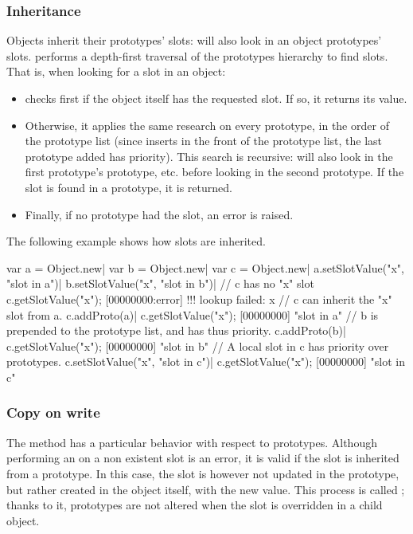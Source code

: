 \subsubsection{Inheritance}

Objects inherit their prototypes' slots:  will also
look in an object prototypes' slots.  performs a
depth-first traversal of the prototypes hierarchy to find slots. That is,
when looking for a slot in an object:

\begin{itemize}
\item {} checks first if the object itself has the
  requested slot. If so, it returns its value.
\item Otherwise, it applies the same research on every prototype, in the
  order of the prototype list (since  inserts in
  the front of the prototype list, the last prototype added has
  priority). This search is recursive:  will also
  look in the first prototype's prototype, etc. before looking in the second
  prototype. If the slot is found in a prototype, it is returned.
\item Finally, if no prototype had the slot, an error is raised.
\end{itemize}

The following example shows how slots are inherited.

\begin{urbiscript}[firstnumber=1]
var a = Object.new|
var b = Object.new|
var c = Object.new|
a.setSlotValue("x", "slot in a")|
b.setSlotValue("x", "slot in b")|
// c has no "x" slot
c.getSlotValue("x");
[00000000:error] !!! lookup failed: x
// c can inherit the "x" slot from a.
c.addProto(a)|
c.getSlotValue("x");
[00000000] "slot in a"
// b is prepended to the prototype list, and has thus priority.
c.addProto(b)|
c.getSlotValue("x");
[00000000] "slot in b"
// A local slot in c has priority over prototypes.
c.setSlotValue("x", "slot in c")|
c.getSlotValue("x");
[00000000] "slot in c"
\end{urbiscript}

\subsubsection{Copy on write}
\label{sec:lang:cow}
The  method has a particular behavior with
respect to prototypes. Although performing an 
on a non existent slot is an error, it is valid if the slot is inherited
from a prototype. In this case, the slot is however not updated in the
prototype, but rather created in the object itself, with the new value. This
process is called ; thanks to it, prototypes are not
altered when the slot is overridden in a child object.

